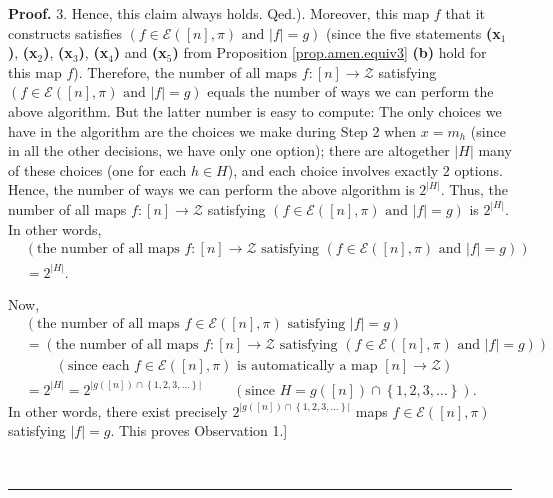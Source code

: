\documentclass[numbers=enddot,12pt,final,onecolumn,notitlepage]{scrartcl}%
\theoremstyle{definition}
\newenvironment{proof}[1][Proof]{\noindent\textbf{#1.} }{\ \rule{0.5em}{0.5em}}
\newenvironment{verlong}{}{}
\begin{document}
\begin{verlong}
\begin{proof}
{3. Hence, this claim always holds. Qed.}). Moreover, this map $f$ that it
constructs satisfies $\left(  f\in\mathcal{E}\left(  \left[  n\right]
,\pi\right)  \text{ and }\left\vert f\right\vert =g\right)  $ (since the five
statements \textbf{(x}$_{1}$\textbf{)}, \textbf{(x}$_{2}$\textbf{)},
\textbf{(x}$_{3}$\textbf{)}, \textbf{(x}$_{4}$\textbf{)} and \textbf{(x}$_{5}%
$\textbf{)} from Proposition \ref{prop.amen.equiv3} \textbf{(b)} hold for this
map $f$). Therefore, the number of all maps $f:\left[  n\right]
\rightarrow\mathcal{Z}$ satisfying $\left(  f\in\mathcal{E}\left(  \left[
n\right]  ,\pi\right)  \text{ and }\left\vert f\right\vert =g\right)  $ equals
the number of ways we can perform the above algorithm. But the latter number
is easy to compute: The only choices we have in the algorithm are the choices
we make during Step 2 when $x=m_{h}$ (since in all the other decisions, we
have only one option); there are altogether $\left\vert H\right\vert $ many of
these choices (one for each $h\in H$), and each choice involves exactly $2$
options. Hence, the number of ways we can perform the above algorithm is
$2^{\left\vert H\right\vert }$. Thus, the number of all maps $f:\left[
n\right]  \rightarrow\mathcal{Z}$ satisfying $\left(  f\in\mathcal{E}\left(
\left[  n\right]  ,\pi\right)  \text{ and }\left\vert f\right\vert =g\right)
$ is $2^{\left\vert H\right\vert }$. In other words,%
\begin{align*}
&  \left(  \text{the number of all maps }f:\left[  n\right]  \rightarrow
\mathcal{Z}\text{ satisfying }\left(  f\in\mathcal{E}\left(  \left[  n\right]
,\pi\right)  \text{ and }\left\vert f\right\vert =g\right)  \right)  \\
&  =2^{\left\vert H\right\vert }.
\end{align*}


Now,%
\begin{align*}
&  \left(  \text{the number of all maps }f\in\mathcal{E}\left(  \left[
n\right]  ,\pi\right)  \text{ satisfying }\left\vert f\right\vert =g\right)
\\
&  =\left(  \text{the number of all maps }f:\left[  n\right]  \rightarrow
\mathcal{Z}\text{ satisfying }\left(  f\in\mathcal{E}\left(  \left[  n\right]
,\pi\right)  \text{ and }\left\vert f\right\vert =g\right)  \right)  \\
&  \ \ \ \ \ \ \ \ \ \ \left(  \text{since each }f\in\mathcal{E}\left(
\left[  n\right]  ,\pi\right)  \text{ is automatically a map }\left[
n\right]  \rightarrow\mathcal{Z}\right)  \\
&  =2^{\left\vert H\right\vert }=2^{\left\vert g\left(  \left[  n\right]
\right)  \cap\left\{  1,2,3,\ldots\right\}  \right\vert }%
\ \ \ \ \ \ \ \ \ \ \left(  \text{since }H=g\left(  \left[  n\right]  \right)
\cap\left\{  1,2,3,\ldots\right\}  \right)  .
\end{align*}
In other words, there exist precisely $2^{\left\vert g\left(  \left[
n\right]  \right)  \cap\left\{  1,2,3,\ldots\right\}  \right\vert }$ maps
$f\in\mathcal{E}\left(  \left[  n\right]  ,\pi\right)  $ satisfying
$\left\vert f\right\vert =g$. This proves Observation 1.]


\end{proof}
\end{verlong}
\end{document}
